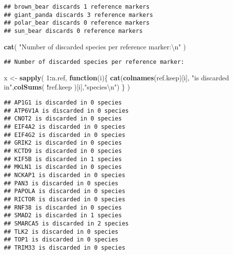 \documentclass[]{article}
\newenvironment{Shaded}{\begin{snugshade}}{\end{snugshade}}
\newcommand{\KeywordTok}[1]{\textcolor[rgb]{0.13,0.29,0.53}{\textbf{#1}}}
\newcommand{\DecValTok}[1]{\textcolor[rgb]{0.00,0.00,0.81}{#1}}
\newcommand{\CharTok}[1]{\textcolor[rgb]{0.31,0.60,0.02}{#1}}
\newcommand{\StringTok}[1]{\textcolor[rgb]{0.31,0.60,0.02}{#1}}
\newcommand{\ControlFlowTok}[1]{\textcolor[rgb]{0.13,0.29,0.53}{\textbf{#1}}}
\newcommand{\OperatorTok}[1]{\textcolor[rgb]{0.81,0.36,0.00}{\textbf{#1}}}
\newcommand{\NormalTok}[1]{#1}
\begin{document}
\begin{verbatim}
## brown_bear discards 1 reference markers
## giant_panda discards 3 reference markers
## polar_bear discards 0 reference markers
## sun_bear discards 0 reference markers
\end{verbatim}

\begin{Shaded}
\begin{Highlighting}[]
\KeywordTok{cat}\NormalTok{( }\StringTok{"Number of discarded species per reference marker:}\CharTok{\textbackslash{}n}\StringTok{"}\NormalTok{ )}
\end{Highlighting}
\end{Shaded}

\begin{verbatim}
## Number of discarded species per reference marker:
\end{verbatim}

\begin{Shaded}
\begin{Highlighting}[]
\NormalTok{x <-}\StringTok{ }\KeywordTok{sapply}\NormalTok{( }\DecValTok{1}\OperatorTok{:}\NormalTok{n.ref, }\ControlFlowTok{function}\NormalTok{(i)\{}
  \KeywordTok{cat}\NormalTok{(}\KeywordTok{colnames}\NormalTok{(ref.keep)[i], }\StringTok{"is discarded in"}\NormalTok{,}\KeywordTok{colSums}\NormalTok{( }\OperatorTok{!}\NormalTok{ref.keep )[i],}\StringTok{"species}\CharTok{\textbackslash{}n}\StringTok{"}\NormalTok{)}
\NormalTok{\} )}
\end{Highlighting}
\end{Shaded}

\begin{verbatim}
## AP1G1 is discarded in 0 species
## ATP6V1A is discarded in 0 species
## CNOT2 is discarded in 0 species
## EIF4A2 is discarded in 0 species
## EIF4G2 is discarded in 0 species
## GRIK2 is discarded in 0 species
## KCTD9 is discarded in 0 species
## KIF5B is discarded in 1 species
## MKLN1 is discarded in 0 species
## NCKAP1 is discarded in 0 species
## PAN3 is discarded in 0 species
## PAPOLA is discarded in 0 species
## RICTOR is discarded in 0 species
## RNF38 is discarded in 0 species
## SMAD2 is discarded in 1 species
## SMARCA5 is discarded in 2 species
## TLK2 is discarded in 0 species
## TOP1 is discarded in 0 species
## TRIM33 is discarded in 0 species
\end{verbatim}
\end{document}
